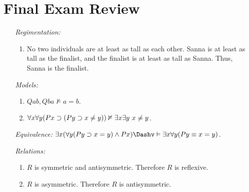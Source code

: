 \documentclass[a4paper, 11pt]{article} %
\begin{document}
\section*{Final Exam Review}

\begin{enumerate}
  \item[\it Regimentation:]
    \begin{enumerate}
      \item No two individuals are at least as tall as each other. Sanna is at least as tall as the finalist, and the finalist is at least as tall as Sanna. Thus, Sanna is the finalist.
    \end{enumerate}
  \item[\it Models:]
    \begin{enumerate}
      \item $Qab, Qba \nvDash a=b$.
      \item $\forall x\forall y(Px \supset (Py \supset x \neq y)) \nvDash \exists x\exists y\ x \neq y$.
    \end{enumerate}
  \item[\it Equivalence:] $\qt{\exists}{x}(\qt{\forall}{y}(Py \supset x = y) \wedge Px) \Dashv\vDash \qt{\exists}{x}\qt{\forall}{y}(Py \equiv x = y)$.
  \item[\it Relations:]
    \begin{enumerate}
      \item $R$ is symmetric and antisymmetric. Therefore $R$ is reflexive.
      \item $R$ is asymmetric. Therefore $R$ is antisymmetric.
    \end{enumerate}
\end{enumerate}
\end{document}
